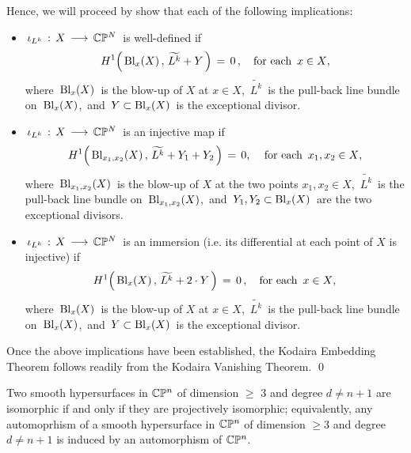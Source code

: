 \vskip 0.3cm
\noindent
Hence, we will proceed by show that each of the following implications:
\begin{itemize}
\item
	\,$\iota_{L^{k}} \, : \, X \, \longrightarrow \, \mathbb{C}\mathbb{P}^{N}$\, is well-defined if
	\begin{equation*}
	H^{1}\!\left(\,\textnormal{Bl}_{x}(X) \,,\,\widetilde{L^{k}}+Y\,\right) \,=\, 0\,,
	\quad
	\textnormal{for each \,$x \in X$},
	\end{equation*}
	where \,$\textnormal{Bl}_{x}(X)$\, is the blow-up of $X$ at $x \in X$,
	\,$\widetilde{L^{k}}$\, is the pull-back line bundle on \,$\textnormal{Bl}_{x}(X)$,\,
	and \,$Y \subset \textnormal{Bl}_{x}(X)$\, is the exceptional divisor.
	\vskip 0.3cm
\item
	\,$\iota_{L^{k}} \, : \, X \, \longrightarrow \, \mathbb{C}\mathbb{P}^{N}$\, is an injective map if
	\begin{equation*}
	H^{1}\!\left(\,\textnormal{Bl}_{x_{1},x_{2}}(X) \,,\, \widetilde{L^{k}}+Y_{1}+Y_{2}\,\right) \,=\, 0,\,
	\quad
	\textnormal{for each \,$x_{1}, x_{2} \in X$},
	\end{equation*}
	where \,$\textnormal{Bl}_{x_{1},x_{2}}(X)$\, is the blow-up of $X$ at the two points $x_{1}, x_{2} \in X$,
	\,$\widetilde{L^{k}}$\, is the pull-back line bundle on \,$\textnormal{Bl}_{x_{1},x_{2}}(X)$,\,
	and \,$Y_{1}, Y_{2} \subset \textnormal{Bl}_{x}(X)$\, are the two exceptional divisors.
	\vskip 0.3cm
\item
	\,$\iota_{L^{k}} \, : \, X \, \longrightarrow \, \mathbb{C}\mathbb{P}^{N}$\, is an immersion (i.e. its differential at each point of $X$ is injective) if
	\begin{equation*}
	H^{1}\!\left(\,\textnormal{Bl}_{x}(X) \,,\,\widetilde{L^{k}}+2 \cdot Y\,\right) \,=\, 0\,,
	\quad
	\textnormal{for each \,$x \in X$},
	\end{equation*}
	where \,$\textnormal{Bl}_{x}(X)$\, is the blow-up of $X$ at $x \in X$,
	\,$\widetilde{L^{k}}$\, is the pull-back line bundle on \,$\textnormal{Bl}_{x}(X)$,\,
	and \,$Y \subset \textnormal{Bl}_{x}(X)$\, is the exceptional divisor.
\end{itemize}
Once the above implications have been established, the Kodaira Embedding Theorem
follows readily from the Kodaira Vanishing Theorem.
\qed


\vskip 0.5cm
\begin{theorem}
\mbox{}
\vskip 0.1cm
\noindent
Two smooth hypersurfaces in $\mathbb{C}\mathbb{P}^{n}$
of dimension $\geq$ $3$ and degree $d \neq n + 1$
are isomorphic if and only if they are projectively isomorphic;
equivalently, any automoprhism of a smooth hypersurface
in $\mathbb{C}\mathbb{P}^{n}$ of dimension $\geq 3$ and degree $d \neq n+ 1$
is induced by an automorphism of $\mathbb{C}\mathbb{P}^{n}$.
\end{theorem}

